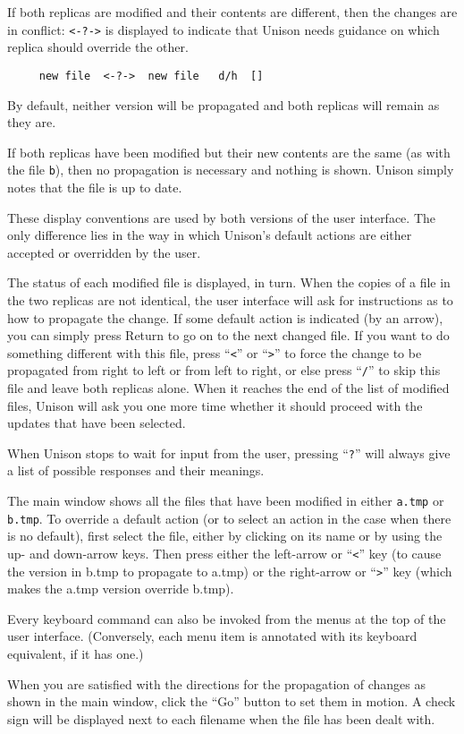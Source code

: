 \documentclass{article}
\begin{document}
If both replicas are modified and their contents are different, then
the changes are in conflict: \texttt{<-?->} is displayed to indicate
that Unison needs guidance on which replica should override the
other.
\begin{verbatim}
     new file  <-?->  new file   d/h  []
\end{verbatim}
By default, neither version will be propagated and both
replicas will remain as they are.

If both replicas have been modified but their new contents are the same
(as with the file {\tt b}), then no propagation is necessary and
nothing is shown.  Unison simply notes that the file is up to date.

These display conventions are used by both versions of the user
interface.  The only difference lies in the way in which Unison's
default actions are either accepted or overridden by the user.

\begin{textui}
The status of each modified file is displayed, in turn.
When the copies of a file in the two replicas are not identical, the
user interface will ask for instructions as to how to propagate the
change.  If some default action is indicated (by an arrow), you can
simply press Return to go on to the next changed file.  If you want to
do something different with this file, press ``\verb|<|'' or ``\verb|>|'' to force
the change to be propagated from right to left or from left to right,
or else press ``\verb|/|'' to skip this file and leave both replicas alone.
When it reaches the end of the list of modified files, Unison will ask
you one more time whether it should proceed with the updates that have
been selected.

When Unison stops to wait for input from the user, pressing ``\verb|?|''
will always give a list of possible responses and their meanings.
\end{textui}

\begin{tkui}
The main window shows all the files that have been modified in either
{\tt a.tmp} or {\tt b.tmp}.  To override a default action (or to select
an action in the case when there is no default), first select the file, either
by clicking on its name or by using the up- and down-arrow keys.  Then
press either the left-arrow or ``\verb|<|'' key (to cause the version in b.tmp to
propagate to a.tmp) or the right-arrow or ``\verb|>|'' key (which makes the a.tmp
version override b.tmp).

Every keyboard command can also be invoked from the menus at the top
of the user interface.  (Conversely, each menu item is annotated with
its keyboard equivalent, if it has one.)

When you are satisfied with the directions for the propagation of changes
as shown in the main window, click the ``Go'' button to set them in
motion.  A check sign will be displayed next to each filename
when the file has been dealt with.
\end{tkui}
\end{document}
